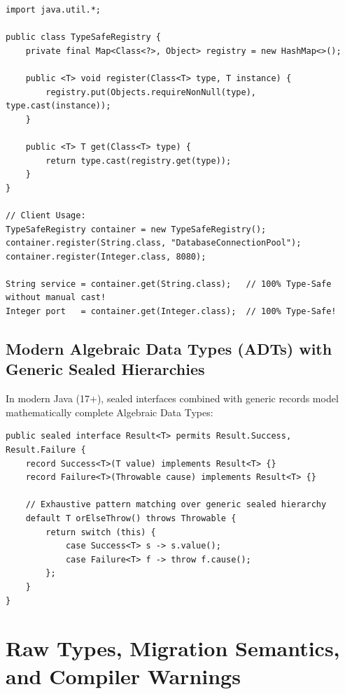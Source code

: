 \documentclass[10pt,journal,compsoc,onecolumn]{IEEEtran}
\begin{document}
\begin{lstlisting}[caption={Production Heterogeneous Type-Safe Container}, label={lst:hetero_container}]
import java.util.*;

public class TypeSafeRegistry {
    private final Map<Class<?>, Object> registry = new HashMap<>();

    public <T> void register(Class<T> type, T instance) {
        registry.put(Objects.requireNonNull(type), type.cast(instance));
    }

    public <T> T get(Class<T> type) {
        return type.cast(registry.get(type));
    }
}

// Client Usage:
TypeSafeRegistry container = new TypeSafeRegistry();
container.register(String.class, "DatabaseConnectionPool");
container.register(Integer.class, 8080);

String service = container.get(String.class);   // 100% Type-Safe without manual cast!
Integer port   = container.get(Integer.class);  // 100% Type-Safe!
\end{lstlisting}

\subsection{Modern Algebraic Data Types (ADTs) with Generic Sealed Hierarchies}
In modern Java (17+), sealed interfaces combined with generic records model mathematically complete Algebraic Data Types:

\begin{lstlisting}[caption={Generic Algebraic Result / Either Type (Java 17+)}, label={lst:sealed_adt}]
public sealed interface Result<T> permits Result.Success, Result.Failure {
    record Success<T>(T value) implements Result<T> {}
    record Failure<T>(Throwable cause) implements Result<T> {}

    // Exhaustive pattern matching over generic sealed hierarchy
    default T orElseThrow() throws Throwable {
        return switch (this) {
            case Success<T> s -> s.value();
            case Failure<T> f -> throw f.cause();
        };
    }
}
\end{lstlisting}

\section{Raw Types, Migration Semantics, and Compiler Warnings}
\label{sec:raw_types}
\end{document}
